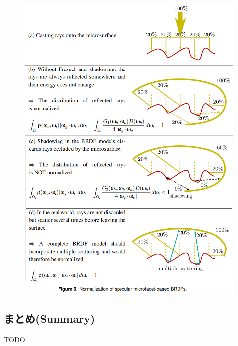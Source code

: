 \documentclass[a4j,xelatex,ja=standard]{bxjsarticle}
\begin{document}
\begin{figure}
    \includegraphics[width=\textwidth]{Figure6_1.png}
    \includegraphics[width=\textwidth]{Figure6_2.png}
    \caption{}
    \label{fig:6}
\end{figure}

\subsection{まとめ(Summary)}

TODO
\end{document}
